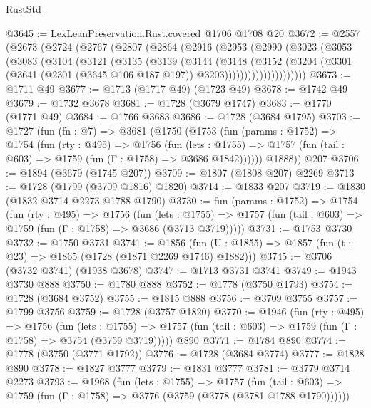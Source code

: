 \begin{lexlean}{RustStd}
\begin{coremodule}
@3645 := LexLeanPreservation.Rust.covered @1706 @1708 @20
@3672 := @2557
    (@2673
      (@2724
        (@2767
          (@2807
            (@2864
              (@2916
                (@2953
                  (@2990
                    (@3023
                      (@3053
                        (@3083
                          (@3104
                            (@3121
                              (@3135
                                (@3139
                                  (@3144
                                    (@3148
                                      (@3152
                                        (@3204
                                          (@3301
                                            (@3641
                                              (@2301 (@3645 @106 @187 @197))
                                              @3203)))))))))))))))))))))
@3673 := @1711 @49
@3677 := @1713 (@1717 @49) (@1723 @49)
@3678 := @1742 @49
@3679 := @1732 @3678
@3681 := @1728 (@3679 @1747)
@3683 := @1770 (@1771 @49)
@3684 := @1766 @3683
@3686 := @1728 (@3684 @1795)
@3703 := @1727
    (fun (fn : @7) =>
    @3681
      (@1750
        (@1753
          (fun (params : @1752) =>
          @1754
            (fun (rty : @495) =>
            @1756
              (fun (lets : @1755) =>
              @1757 (fun (tail : @603) => @1759 (fun (Γ : @1758) => @3686 @1842))))))
        @1888))
    @207
@3706 := @1894 (@3679 (@1745 @207))
@3709 := @1807 (@1808 @207) @2269
@3713 := @1728 (@1799 (@3709 @1816) @1820)
@3714 := @1833 @207
@3719 := @1830 (@1832 @3714 @2273 @1788 @1790)
@3730 := fun (params : @1752) =>
  @1754
    (fun (rty : @495) =>
    @1756
      (fun (lets : @1755) =>
      @1757 (fun (tail : @603) => @1759 (fun (Γ : @1758) => @3686 (@3713 @3719)))))
@3731 := @1753 @3730
@3732 := @1750 @3731
@3741 := @1856 (fun (U : @1855) => @1857 (fun (t : @23) => @1865 (@1728 (@1871 @2269 @1746) @1882)))
@3745 := @3706 (@3732 @3741) (@1938 @3678)
@3747 := @1713 @3731 @3741
@3749 := @1943 @3730 @888
@3750 := @1780 @888
@3752 := @1778 (@3750 @1793)
@3754 := @1728 (@3684 @3752)
@3755 := @1815 @888
@3756 := @3709 @3755
@3757 := @1799 @3756
@3759 := @1728 (@3757 @1820)
@3770 := @1946
    (fun (rty : @495) =>
    @1756
      (fun (lets : @1755) =>
      @1757 (fun (tail : @603) => @1759 (fun (Γ : @1758) => @3754 (@3759 @3719)))))
    @890
@3771 := @1784 @890
@3774 := @1778 (@3750 (@3771 @1792))
@3776 := @1728 (@3684 @3774)
@3777 := @1828 @890
@3778 := @1827 @3777
@3779 := @1831 @3777
@3781 := @3779 @3714 @2273
@3793 := @1968
    (fun (lets : @1755) =>
    @1757
      (fun (tail : @603) => @1759 (fun (Γ : @1758) => @3776 (@3759 (@3778 (@3781 @1788 @1790))))))

\end{coremodule}
\end{lexlean}
